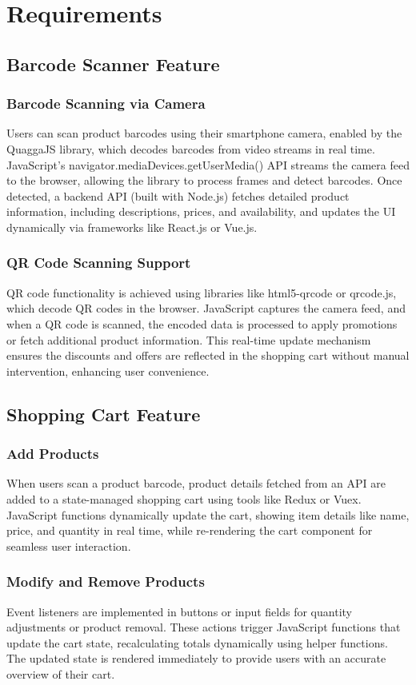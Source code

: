 \documentclass[conference]{IEEEtran}
\begin{document}
\section{Requirements}

\subsection{Barcode Scanner Feature}
\subsubsection{Barcode Scanning via Camera}
Users can scan product barcodes using their smartphone camera, enabled by the QuaggaJS library, which decodes barcodes from video streams in real time. JavaScript's navigator.mediaDevices.getUserMedia() API streams the camera feed to the browser, allowing the library to process frames and detect barcodes. Once detected, a backend API (built with Node.js) fetches detailed product information, including descriptions, prices, and availability, and updates the UI dynamically via frameworks like React.js or Vue.js.
\subsubsection{QR Code Scanning Support}
 QR code functionality is achieved using libraries like html5-qrcode or qrcode.js, which decode QR codes in the browser. JavaScript captures the camera feed, and when a QR code is scanned, the encoded data is processed to apply promotions or fetch additional product information. This real-time update mechanism ensures the discounts and offers are reflected in the shopping cart without manual intervention, enhancing user convenience.
\subsection{Shopping Cart Feature}
\subsubsection{Add Products}
When users scan a product barcode, product details fetched from an API are added to a state-managed shopping cart using tools like Redux or Vuex. JavaScript functions dynamically update the cart, showing item details like name, price, and quantity in real time, while re-rendering the cart component for seamless user interaction.
\subsubsection{Modify and Remove Products}
Event listeners are implemented in buttons or input fields for quantity adjustments or product removal. These actions trigger JavaScript functions that update the cart state, recalculating totals dynamically using helper functions. The updated state is rendered immediately to provide users with an accurate overview of their cart.
\end{document}
